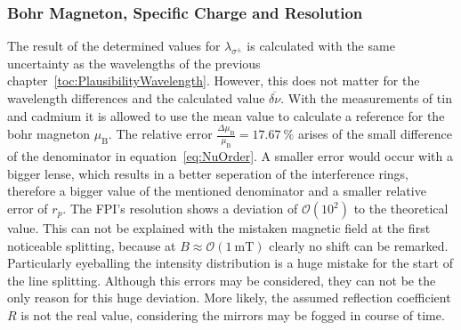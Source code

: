\subsubsection{Bohr Magneton, Specific Charge and Resolution}
\label{toc:PlausibilityZeeman}

The result of the determined values for $\lambda_{\sigma^\pm}$ is calculated with the same uncertainty as the wavelengths of the previous chapter~\ref{toc:PlausibilityWavelength}.
However, this does not matter for the wavelength differences and the calculated value $\overline{\delta\nu}$. 
With the measurements of tin and cadmium it is allowed to use the mean value to calculate a reference for the bohr magneton $\mu_\text{B}$. 
The relative error $\frac{\Delta\mu_\text{B}}{\mu_\text{B}} = \SI{17.67}{\percent}$ arises of the small difference of the denominator in equation~\ref{eq:NuOrder}. 
A smaller error would occur with a bigger lense, which results in a better seperation of the interference rings, therefore a bigger value of the mentioned denominator and a smaller relative error of $r_p$.
The FPI's resolution shows a deviation of $\mathcal{O}(10^2)$ to the theoretical value.
This can not be explained with the mistaken magnetic field at the first noticeable splitting, because at $B \approx \mathcal{O}(\SI{1}{\milli\tesla})$ clearly no shift can be remarked.
Particularly eyeballing the intensity distribution is a huge mistake for the start of the line splitting.
Although this errors may be considered, they can not be the only reason for this huge deviation.
More likely, the assumed reflection coefficient $R$ is not the real value, considering the mirrors may be fogged in course of time.
